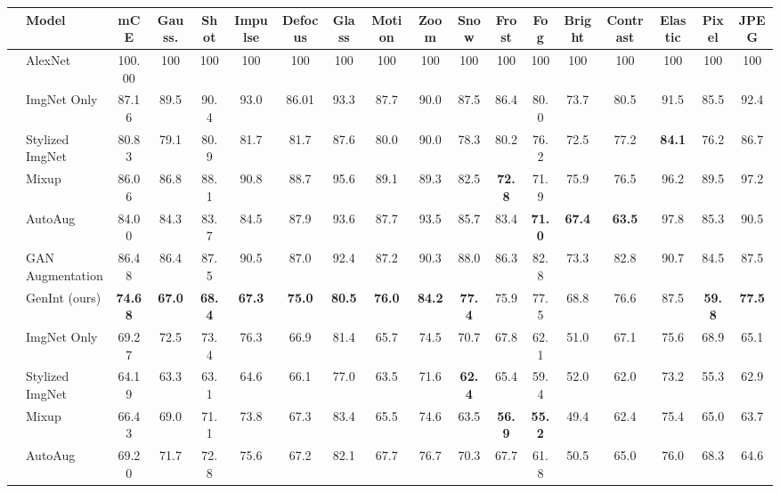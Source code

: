 \documentclass[final]{cvpr}
\begin{document}
 \begin{table*}[t]
\centering
\setlength{\tabcolsep}{3.5pt}
\scriptsize
\vspace{-3mm}
    \begin{tabular}{ll|c|ccc|cccc|cccc|cccc}
         \toprule
         & Model & \textbf{mCE } & Gauss. & Shot & Impulse & Defocus & Glass & Motion & Zoom & Snow & Frost & Fog & Bright & Contrast & Elastic & Pixel & JPEG \\
         \midrule  
          & AlexNet & 100.00 &100 &100 &100 &100 &100 &100 &100 &100 &100 &100 & 100 &100 &100 &100 &100  \\
          \midrule
          \parbox[t]{3mm}{} & ImgNet Only \cite{He_2016} & 87.16 & 89.5&	90.4&	93.0 &	86.01 &	93.3 &	87.7 &	90.0 &	87.5 &	86.4 &	80.0 &	73.7 &	80.5 &	91.5 &	85.5 &	92.4 \\    & Stylized ImgNet \cite{imagenetbiased} & 80.83 & 79.1&	80.9&	81.7&	81.7&	87.6&	80.0&	90.0&	78.3&	80.2&	76.2&	72.5&	77.2&	\textbf{84.1} &	76.2&	86.7\\
          & Mixup \cite{zhang2017mixup} & 86.06 & 86.8 &	88.1&	90.8&	88.7&	95.6&	89.1&	89.3&	82.5&	\textbf{72.8}&	71.9&	75.9&	76.5 &	96.2&	89.5&	97.2\\
          & AutoAug \cite{cubuk2018autoaugment}  & 84.00 & 84.3&	83.7&	84.5&	87.9&	93.6&	87.7 &	93.5&	85.7&	83.4&	\textbf{71.0}&	\textbf{67.4}&	\textbf{63.5}&	97.8&	85.3&	90.5 \\
          & GAN Augmentation \cite{CAS} & 86.48 & 86.4&	87.5&	90.5&	87.0&	92.4&	87.2&	90.3&	88.0&	86.3&	82.8&	73.3&	82.8&	90.7&	84.5&	87.5 \\
           & GenInt (ours) & \textbf{74.68} & \textbf{67.0}&	\textbf{68.4}&	\textbf{67.3}&	\textbf{75.0}&	\textbf{80.5}&	\textbf{76.0}&	\textbf{84.2}&	\textbf{77.4}&	75.9&	77.5&	68.8&	76.6 &	87.5&	\textbf{59.8}&	\textbf{77.5}  \\ \midrule
\parbox[t]{3mm}{}    & ImgNet Only \cite{He_2016} & 69.27 & 72.5&	73.4&	76.3&	66.9&	81.4&	65.7&	74.5&	70.7&	67.8&	62.1&	51.0&	67.1&	75.6&	68.9&	65.1 \\
           & Stylized ImgNet \cite{imagenetbiased} & 64.19& 63.3&	63.1&	64.6&	66.1&	77.0&	63.5&	71.6&	\textbf{62.4} &	65.4&	59.4&	52.0&	62.0&	73.2&	55.3&	62.9 \\
           & Mixup \cite{zhang2017mixup} & 66.43& 69.0& 	71.1& 	73.8& 	67.3& 	83.4& 	65.5& 74.6& 	63.5& 	\textbf{56.9}& 	\textbf{55.2} & 	49.4& 	62.4& 	75.4& 	65.0& 	63.7 \\
           & AutoAug \cite{cubuk2018autoaugment}  & 69.20 & 71.7&	72.8&	75.6&	67.2&	82.1&	67.7&	76.7&	70.3&	67.7&	61.8&	50.5&	65.0&	76.0&	68.3&	64.6 \\
           

\end{tabular}
\end{table*}
\end{document}
